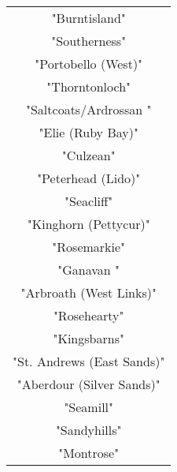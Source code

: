 \documentclass[a4paper,10pt]{article}
\begin{document}
\begin{table}[!tb]
\begin{center}
\begin{tabular}{c}
 "Burntisland"                   \\
 "Southerness"                   \\
 "Portobello (West)"             \\
 "Thorntonloch"                  \\
 "Saltcoats/Ardrossan "          \\
 "Elie (Ruby Bay)"               \\
 "Culzean"                       \\
 "Peterhead (Lido)"              \\
 "Seacliff"                      \\
 "Kinghorn (Pettycur)"           \\
 "Rosemarkie"                    \\
 "Ganavan "                      \\
 "Arbroath (West Links)"         \\
 "Rosehearty"                    \\
 "Kingsbarns"                    \\
 "St. Andrews (East Sands)"      \\
 "Aberdour (Silver Sands)"       \\
 "Seamill"                       \\
 "Sandyhills"                    \\
 "Montrose"                      \\
\end{tabular}
\label{bathingWaters(description)} 
\end{center}
\end{table}
\end{document}
